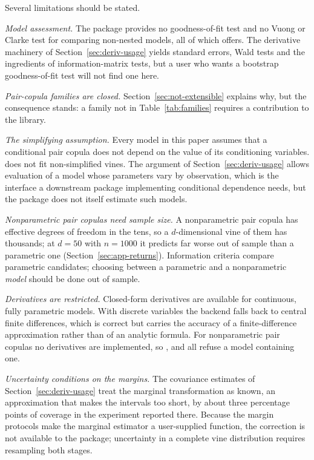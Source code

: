 \documentclass[article]{jss}
\begin{document}
Several limitations should be stated.

\emph{Model assessment.}  The package provides no goodness-of-fit test and no
Vuong or Clarke test for comparing non-nested models, all of which
 offers.  The derivative machinery of
Section~\ref{sec:deriv-usage} yields standard errors, Wald tests and the
ingredients of information-matrix tests, but a user who wants a bootstrap
goodness-of-fit test will not find one here.

\emph{Pair-copula families are closed.}  Section~\ref{sec:not-extensible}
explains why, but the consequence stands: a family not in
Table~\ref{tab:families} requires a contribution to the  library.

\emph{The simplifying assumption.}  Every model in this paper assumes that a
conditional pair copula does not depend on the value of its conditioning
variables.   does not fit non-simplified vines.  The
 argument of Section~\ref{sec:deriv-usage} allows evaluation
of a model whose parameters vary by observation, which is the interface a
downstream package implementing conditional dependence needs, but the package
does not itself estimate such models.

\emph{Nonparametric pair copulas need sample size.}  A nonparametric pair
copula has effective degrees of freedom in the tens, so a $d$-dimensional vine
of them has thousands; at $d = 50$ with $n = 1000$ it predicts far worse out
of sample than a parametric one (Section~\ref{sec:app-returns}).  Information
criteria compare parametric candidates; choosing between a parametric and a
nonparametric \emph{model} should be done out of sample.

\emph{Derivatives are restricted.}  Closed-form derivatives are available for
continuous, fully parametric models.  With discrete variables the backend falls
back to central finite differences, which is correct but carries the accuracy of
a finite-difference approximation rather than of an analytic formula.  For
nonparametric pair copulas no derivatives are implemented, so ,
 and  all refuse a model containing one.

\emph{Uncertainty conditions on the margins.}  The covariance estimates of
Section~\ref{sec:deriv-usage} treat the marginal transformation as known, an
approximation \citep{joe2005, ko2019} that makes the intervals too short, by
about three percentage points of coverage in the experiment reported there.
Because the margin protocols make the marginal estimator a user-supplied
function, the correction is not available to the package; uncertainty in a
complete vine distribution requires resampling both stages.
\end{document}

